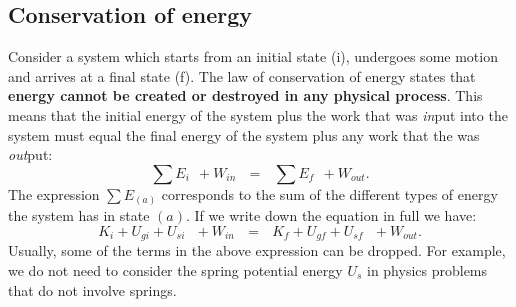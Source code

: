 \documentclass[letterpaper,9pt,journal]{IEEEtran}
\newcommand{\be}{\begin{equation}}
\newcommand{\ee}{\end{equation}}
\begin{document}
\vspace{-3mm}
\subsection{Conservation of energy}

Consider a system which starts from an initial state (i),
undergoes some motion and arrives at a final state (f).
The law of conservation of energy states that 
\textbf{energy cannot be created or destroyed in any physical process}.
This means that the initial energy of the system plus the work 
that was \emph{in}put into the system must equal 
the final energy of the system plus any work that the was \emph{out}put:
\be
  \sum E_{i} \ \ + W_{in} \ \ \  =  \ \ \ \sum E_{f} \ \  + W_{out}.
  \label{CONSERVATIONofENERGY}
\ee
The expression $\sum E_{(a)}$ corresponds to the sum of 
the different types of energy the system has in state $(a)$.
If we write down the equation in full we have:
\[
 K_i + U_{gi} + U_{si} \ \ \  + W_{in}  \ \ \ = \ \ \  K_f + U_{gf} + U_{sf} \ \ \ + W_{out}.
\]
Usually, some of the terms in the above expression can be dropped.
For example, we do not need to consider the spring potential energy $U_s$
in physics problems that do not involve springs.
%


%



\end{document}
